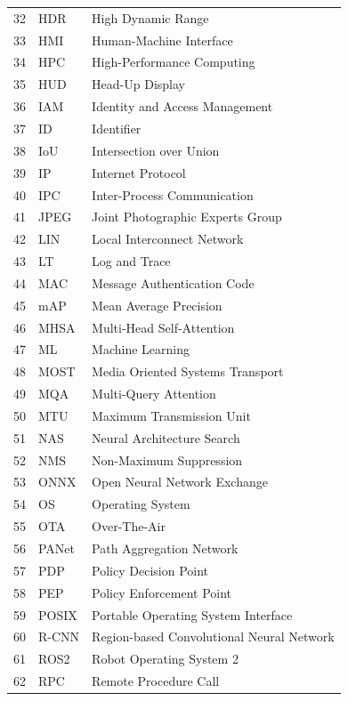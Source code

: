 \begin{longtable}{|c|l|l|}
    32 & HDR & High Dynamic Range \\
    33 & HMI & Human-Machine Interface \\
    34 & HPC & High-Performance Computing \\
    35 & HUD & Head-Up Display \\
    36 & IAM & Identity and Access Management \\
    37 & ID & Identifier \\
    38 & IoU & Intersection over Union \\
    39 & IP & Internet Protocol \\
    40 & IPC & Inter-Process Communication \\
    41 & JPEG & Joint Photographic Experts Group \\
    42 & LIN & Local Interconnect Network \\
    43 & LT & Log and Trace \\
    44 & MAC & Message Authentication Code \\
    45 & mAP & Mean Average Precision \\
    46 & MHSA & Multi-Head Self-Attention \\
    47 & ML & Machine Learning \\
    48 & MOST & Media Oriented Systems Transport \\
    49 & MQA & Multi-Query Attention \\
    50 & MTU & Maximum Transmission Unit \\
    51 & NAS & Neural Architecture Search \\
    52 & NMS & Non-Maximum Suppression \\
    53 & ONNX & Open Neural Network Exchange \\
    54 & OS & Operating System \\
    55 & OTA & Over-The-Air \\
    56 & PANet & Path Aggregation Network \\
    57 & PDP & Policy Decision Point \\
    58 & PEP & Policy Enforcement Point \\
    59 & POSIX & Portable Operating System Interface \\
    60 & R-CNN & Region-based Convolutional Neural Network \\
    61 & ROS2 & Robot Operating System 2 \\
    62 & RPC & Remote Procedure Call \\

\end{longtable}
